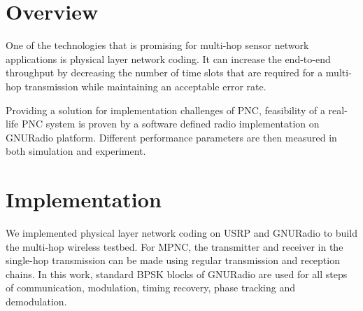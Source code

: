 \label{chapter:multi}

\section{Overview}

One of the technologies that is promising for multi-hop sensor network applications is physical layer network coding. It can increase the end-to-end throughput by decreasing the number of time slots that are required for a multi-hop transmission while maintaining an acceptable error rate. %


Providing a solution for implementation challenges of PNC, feasibility of a real-life PNC system is proven by a software defined radio implementation on GNURadio platform. Different performance parameters are then measured in both simulation and experiment. 

\section{Implementation}
We implemented physical layer network coding on USRP and GNURadio to build the multi-hop wireless testbed.
For MPNC, the transmitter and receiver in the single-hop transmission can be made using regular transmission and reception chains. In this work, standard BPSK blocks of GNURadio are used for all steps of communication, modulation, timing recovery, phase tracking and demodulation.

